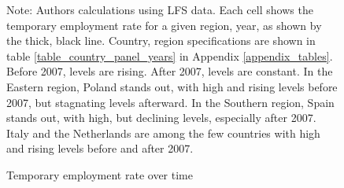 \documentclass[12pt]{article}
\begin{document}
\begin{figure}[htp!]
    \caption{Temporary employment rate over time}
    \label{graph_eu_lfs_rate_region}

    \footnotesize{Note: Authors calculations using LFS data.  Each cell shows the temporary employment rate for a given region, year, as shown by the thick, black line.  Country, region specifications are shown in table \ref{table_country_panel_years} in Appendix \ref{appendix_tables}.  Before 2007, levels are rising.  After 2007, levels are constant.  In the Eastern region, Poland stands out, with high and rising levels before 2007, but stagnating levels afterward.  In the Southern region, Spain stands out, with high, but declining levels, especially after 2007.  Italy and the Netherlands are among the few countries with high and rising levels before and after 2007.}
\end{figure}
\end{document}

